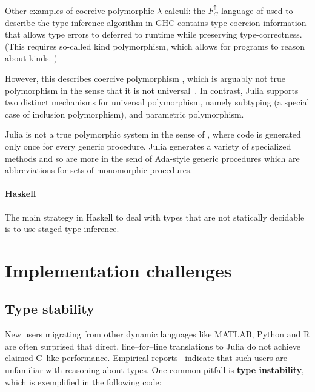 \documentclass[pldi]{sigplanconf-pldi15}
\begin{document}
Other examples of coercive polymorphic $\lambda$-calculi: the $F^\uparrow_C$
language of \cite{Vytiniotis2012,haskellkindtypes} used to describe the type
inference algorithm in GHC \cite{Weirich2011} contains type coercion
information that allows type errors to deferred to runtime
\cite{Vytiniotis2012} while preserving type-correctness. (This requires
so-called kind polymorphism, which allows for programs to reason about kinds.
\cite{haskellkindtypes})


However, this describes coercive polymorphism \cite{Cardelli1985}, which
is arguably not true polymorphism in the sense that it is not
universal~\cite{Strachey1967,Strachey2000}. In contrast, Julia supports two
distinct mechanisms for universal polymorphism, namely subtyping (a special
case of inclusion polymorphism), and parametric polymorphism.

Julia is not a true polymorphic system in the sense of \cite{Cardelli1985},
where code is generated only once for every generic procedure. Julia generates
a variety of specialized methods and so are more in the send of Ada-style
generic procedures which are abbreviations for sets of monomorphic procedures.


\paragraph{Haskell}

The main strategy in Haskell to deal with types that are not statically
decidable is to use staged type inference.~\cite{Shields1998}




\section{Implementation challenges}

\subsection{Type stability}
New users migrating from other dynamic languages like MATLAB, Python and R are
often surprised that direct, line--for--line translations to Julia do not
achieve claimed C--like performance. Empirical reports~\cite{julia-users}
indicate that such users are unfamiliar with reasoning about types. One common
pitfall is \textbf{type instability}, which is exemplified in the following
code:
\end{document}
